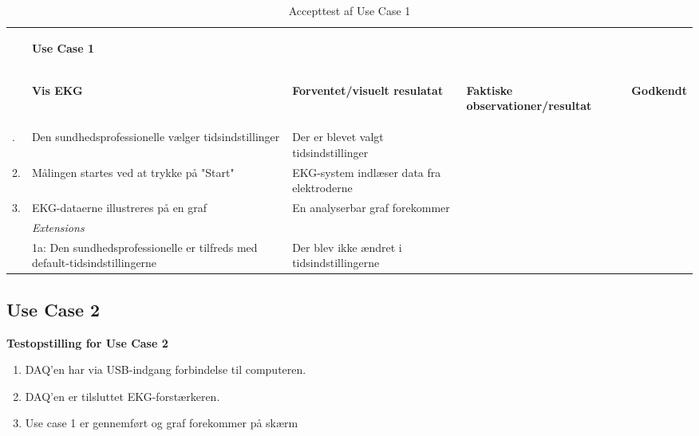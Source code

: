 \begin{table}[H]
	\begin{tabularx}{\textwidth}{l X X X c}
	\toprule
	~ & \begin{large}\textbf{Use Case 1}\end{large} & ~ & ~ & ~\\
	~ & \begin{large}\textbf{Vis EKG} \end{large}
	& \begin{large}\textbf{Forventet/visuelt resulatat}\end{large}
	& \begin{large}\textbf{Faktiske observationer/resultat}\end{large}
	& \begin{large}\textbf{Godkendt}\end{large}
	\\			\midrule \addlinespace[3mm]
					1.	& Den sundhedsprofessionelle vælger tidsindstillinger 
						& Der er blevet valgt tidsindstillinger 
						& ~
						& %
						\\ \midrule
					2. 	& Målingen startes ved at trykke på "Start"
						& EKG-system indlæser data fra elektroderne 
						& ~
						& %
						\\ \midrule
					3.	&  EKG-dataerne illustreres på en graf 
     					&  En analyserbar graf forekommer
     					& ~
     					& %
     					\\ \midrule
     				~	& \textit{Extensions}
     					&	~
     					&	~		\\ \midrule
     				~ 	&	1a: Den sundhedsprofessionelle er tilfreds med 					default-tidsindstillingerne
     					&  Der blev ikke ændret i tidsindstillingerne 
     					&  %
     					    \\ 

		
	
	\bottomrule	
	\end{tabularx}
	\caption{Accepttest af Use Case 1}
	\label{tab:AT_UC1}
\end{table}


\subsection{Use Case 2}

\textbf{Testopstilling for Use Case 2}
\begin{enumerate}
	\item DAQ’en har via USB-indgang forbindelse til computeren.
	\item DAQ’en er tilsluttet EKG-forstærkeren.
	\item Use case 1 er gennemført og graf forekommer på skærm
\end{enumerate}

